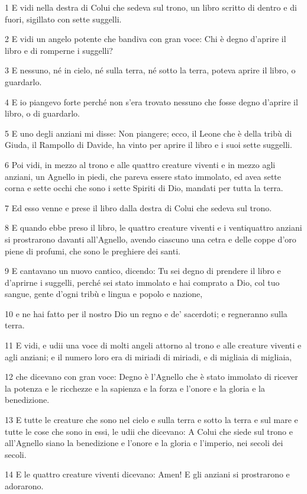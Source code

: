 \par 1 E vidi nella destra di Colui che sedeva sul trono, un libro scritto di dentro e di fuori, sigillato con sette suggelli.
\par 2 E vidi un angelo potente che bandiva con gran voce: Chi è degno d'aprire il libro e di romperne i suggelli?
\par 3 E nessuno, né in cielo, né sulla terra, né sotto la terra, poteva aprire il libro, o guardarlo.
\par 4 E io piangevo forte perché non s'era trovato nessuno che fosse degno d'aprire il libro, o di guardarlo.
\par 5 E uno degli anziani mi disse: Non piangere; ecco, il Leone che è della tribù di Giuda, il Rampollo di Davide, ha vinto per aprire il libro e i suoi sette suggelli.
\par 6 Poi vidi, in mezzo al trono e alle quattro creature viventi e in mezzo agli anziani, un Agnello in piedi, che pareva essere stato immolato, ed avea sette corna e sette occhi che sono i sette Spiriti di Dio, mandati per tutta la terra.
\par 7 Ed esso venne e prese il libro dalla destra di Colui che sedeva sul trono.
\par 8 E quando ebbe preso il libro, le quattro creature viventi e i ventiquattro anziani si prostrarono davanti all'Agnello, avendo ciascuno una cetra e delle coppe d'oro piene di profumi, che sono le preghiere dei santi.
\par 9 E cantavano un nuovo cantico, dicendo: Tu sei degno di prendere il libro e d'aprirne i suggelli, perché sei stato immolato e hai comprato a Dio, col tuo sangue, gente d'ogni tribù e lingua e popolo e nazione,
\par 10 e ne hai fatto per il nostro Dio un regno e de' sacerdoti; e regneranno sulla terra.
\par 11 E vidi, e udii una voce di molti angeli attorno al trono e alle creature viventi e agli anziani; e il numero loro era di miriadi di miriadi, e di migliaia di migliaia,
\par 12 che dicevano con gran voce: Degno è l'Agnello che è stato immolato di ricever la potenza e le ricchezze e la sapienza e la forza e l'onore e la gloria e la benedizione.
\par 13 E tutte le creature che sono nel cielo e sulla terra e sotto la terra e sul mare e tutte le cose che sono in essi, le udii che dicevano: A Colui che siede sul trono e all'Agnello siano la benedizione e l'onore e la gloria e l'imperio, nei secoli dei secoli.
\par 14 E le quattro creature viventi dicevano: Amen! E gli anziani si prostrarono e adorarono.

